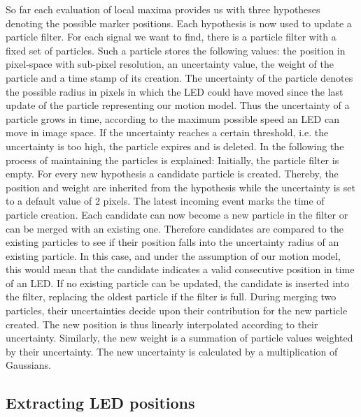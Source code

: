 So far each evaluation of local maxima provides us with three hypotheses denoting the possible marker positions. Each hypothesis is now used to update a particle filter. For each signal we want to find, there is a particle filter with a fixed set of particles. Such a particle stores the following values: the position in pixel-space with sub-pixel resolution, an uncertainty value, the weight of the particle and a time stamp of its creation. The uncertainty of the particle denotes the possible radius in pixels in which the LED could have moved since the last update of the particle representing our motion model. Thus the uncertainty of a particle grows in time, according to the maximum possible speed an LED can move in image space. If the uncertainty reaches a certain threshold, i.e. the uncertainty is too high, the particle expires and is deleted. In the following the process of maintaining the particles is explained:
Initially, the particle filter is empty. For every new hypothesis a candidate particle is created. Thereby, the position and weight are inherited from the hypothesis while the uncertainty is set to a default value of 2 pixels. The latest incoming event marks the time of particle creation.  Each candidate can now become a new particle in the filter or can be merged with an existing one.  Therefore candidates are compared to the existing particles to see if their position falls into the uncertainty radius of an existing particle. In this case, and under the assumption of our motion model, this would mean that the candidate indicates a valid consecutive position in time of an LED. If no existing particle can be updated, the candidate is inserted into the filter, replacing the oldest particle if the filter is full.
During merging two particles, their uncertainties decide upon their contribution for the new particle created. The new position is thus linearly interpolated according to their uncertainty. Similarly, the new weight is a summation of particle values weighted by their uncertainty. The new uncertainty is calculated by a multiplication of Gaussians.


\subsection{Extracting LED positions}\label{sec:ledpositions}

